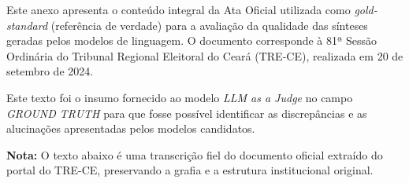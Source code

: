 \label{an:ata-original}

Este anexo apresenta o conteúdo integral da Ata Oficial utilizada como \textit{gold-standard} (referência de verdade) para a avaliação da qualidade das sínteses geradas pelos modelos de linguagem. O documento corresponde à 81ª Sessão Ordinária do Tribunal Regional Eleitoral do Ceará (TRE-CE), realizada em 20 de setembro de 2024. 

Este texto foi o insumo fornecido ao modelo \textit{LLM as a Judge} no campo \textit{GROUND TRUTH} para que fosse possível identificar as discrepâncias e as alucinações apresentadas pelos modelos candidatos.

\begin{itshape}
    \textbf{Nota:} O texto abaixo é uma transcrição fiel do documento oficial extraído do portal do TRE-CE, preservando a grafia e a estrutura institucional original.
\end{itshape}

\vspace{0.5cm}

